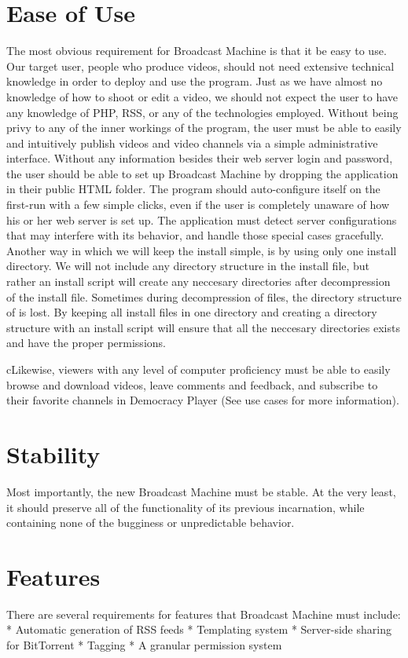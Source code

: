 \documentclass[a4paper,12pt]{report}
\begin{document}
\section{Ease of Use}
The most obvious requirement for Broadcast Machine is that it be easy to use. 
Our target user, people who produce videos, should not need extensive technical knowledge in order to deploy and use the program. 
Just as we have almost no knowledge of how to shoot or edit a video, we should not expect the user to have any knowledge of PHP, RSS, or any of the technologies employed. 
Without being privy to any of the inner workings of the program, the user must be able to easily and intuitively publish videos and video channels via a simple administrative interface. 
Without any information besides their web server login and password, the user should be able to set up Broadcast Machine by dropping the application in their public HTML folder. 
The program should auto-configure itself on the first-run with a few simple clicks, even if the user is completely unaware of how his or her web server is set up. 
The application must detect server configurations that may interfere with its behavior, and handle those special cases gracefully. 
Another way in which we will keep the install simple, is by using only one install directory. 
We will not include any directory structure in the install file, but rather an install script will create any neccesary directories after decompression of the install file. 
Sometimes during decompression of files, the directory structure of is lost. 
By keeping all install files in one directory and creating a directory structure with an install script will ensure that all the neccesary directories exists and have the proper permissions. 


cLikewise, viewers with any level of computer proficiency must be able to easily browse and download videos, leave comments and feedback, and subscribe to their favorite channels in Democracy Player (See use cases for more information).
 

\section{Stability}
Most importantly, the new Broadcast Machine must be stable.
At the very least, it should preserve all of the functionality of its previous incarnation, while containing none of the bugginess or unpredictable behavior.


\section{Features}
There are several requirements for features that Broadcast Machine must include:
 * Automatic generation of RSS feeds
 * Templating system
 * Server-side sharing for BitTorrent
 * Tagging
 * A granular permission system
\end{document}
